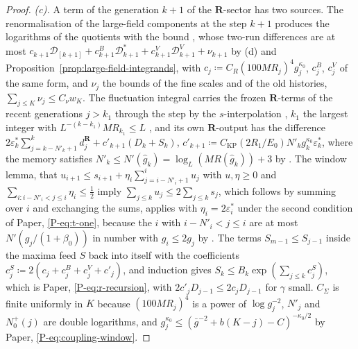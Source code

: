 \documentclass[11pt]{preprint}
\numberwithin{equation}{section}
\theoremstyle{definition}
\theoremstyle{remark}
\theoremstyle{plain}
\begin{document}
\begin{proof}
\emph{(c).} A term of the generation $k + 1$ of the $\mathbf R$-sector has two sources. The renormalisation of the large-field components at the step $k + 1$ produces the logarithms of the quotients \cite[(0.5)]{BalabanLFR1} with the bound \cite[(2.31)]{BalabanCRE}, whose two-run differences are at most $c_{k+1}\mathcal D_{[k+1]} + c^B_{k+1}\mathcal D^*_{k+1} + c^V_{k+1}\mathcal D^V_{k+1} + \nu_{k+1}$ by (d) and Proposition~\ref{prop:large-field-integrands}, with $c_j \coloneqq C_R(100MR_j)^4g_j^{\kappa_0}$, $c^B_j$, $c^V_j$ of the same form, and $\nu_j$ the bounds of the fine scales and of the old histories, $\sum_{j \leq K}\nu_j \leq C_\nu w_K$. The fluctuation integral carries the frozen $\mathbf R$-terms of the recent generations $j > k_1$ through the step by the $s$-interpolation \cite[p.~271, ll.~1--30]{BalabanCRE}, $k_1$ the largest integer with $L^{-(k-k_1)}MR_{k_1} \leq L$ \cite[p.~270, ll.~49--50]{BalabanCRE}, and its own $\mathbf R$-output has the difference $2\varepsilon^*_k\sum_{j=k-N'_k+1}^kd^{\mathbf R}_j + c'_{k+1}(D_k + S_k)$, $c'_{k+1} \coloneqq C_{\mathrm{KP}}(2R_1/E_0)N'_kg_k^{\kappa_0}\varepsilon^*_k$, where the memory satisfies $N'_k \leq N'(\hat g_k) = \log_L(MR(\hat g_k)) + 3$ by \cite[(2.9), p.~256]{BalabanCRE}. The window lemma, that $u_{i+1} \leq s_{i+1} + \eta_i\sum_{j=i-N'_i+1}^iu_j$ with $u, \eta \geq 0$ and $\sum_{i\colon i-N'_i<j\leq i}\eta_i \leq \frac12$ imply $\sum_{j \leq k}u_j \leq 2\sum_{j \leq k}s_j$, which follows by summing over $i$ and exchanging the sums, applies with $\eta_i = 2\varepsilon^*_i$ under the second condition of Paper, \eqref{P-eq:t-one}, because the $i$ with $i - N'_i < j \leq i$ are at most $N'(g_j/(1 + \beta_0))$ in number with $g_i \leq 2g_j$ by \cite[(2.6)]{BalabanCRE}. The terms $S_{m-1} \leq S_{j-1}$ inside the maxima feed $S$ back into itself with the coefficients $c^S_j \coloneqq 2(c_j + c^B_j + c^V_j + c'_j)$, and induction gives $S_k \leq B_k\exp(\sum_{j \leq k}c^S_j)$, which is Paper, \eqref{P-eq:r-recursion}, with $2c'_jD_{j-1} \leq 2c_jD_{j-1}$ for $\gamma$ small. $C_\Sigma$ is finite uniformly in $K$ because $(100MR_j)^4$ is a power of $\log g_j^{-2}$, $N'_j$ and $N^+_0(j)$ are double logarithms, and $g_j^{\kappa_0} \leq (\bar g^{-2} + b(K - j) - C)^{-\kappa_0/2}$ by Paper, \eqref{P-eq:coupling-window}.


\end{proof}
\end{document}
